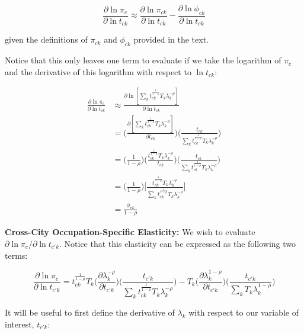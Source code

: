 \documentclass[10pt]{article}
\begin{document}
\begin{equation*}
    \frac{\partial\ln{\pi_{c}}}{\partial\ln{t_{ck}}} \approx \frac{\partial\ln{\pi_{ck}}}{\partial\ln{t_{ck}}} - \frac{\partial\ln{\phi_{ck}}}{\partial\ln{t_{ck}}}
\end{equation*}

given the definitions of $\pi_{ck}$ and $\phi_{ck}$ provided in the text.

Notice that this only leaves one term to evaluate if we take the logarithm of $\pi_{c}$ and the derivative of this logarithm with respect to $\ln{t_{ck}}$:

\begin{align*}
    \frac{\partial\ln{\pi_{c}}}{\partial\ln{t_{ck}}} & \approx \frac{\partial\ln[{\sum\limits_{k}{t^{\frac{1}{1-\rho}}_{ck}}{T_{k}}\lambda_{k}^{-\rho}}]}{\partial\ln{t_{ck}}} \\ &= \Bigg(\frac{\partial[{\sum\limits_{k}{t^{\frac{1}{1-\rho}}_{ck}}{T_{k}}\lambda_{k}^{-\rho}}]}{\partial{t_{ck}}}\Bigg)\Bigg(\frac{t_{ck}}{{\sum\limits_{k}{t^{\frac{1}{1-\rho}}_{ck}}{T_{k}}\lambda_{k}^{-\rho}}}\Bigg)\\ &= \Bigg(\frac{1}{1-\rho}\Bigg)\Bigg(\frac{t_{ck}^{\frac{1}{1-\rho}}{T_{k}}\lambda_{k}^{-\rho}}{t_{ck}}\Bigg)\Bigg(\frac{t_{ck}}{{\sum\limits_{k}{t^{\frac{1}{1-\rho}}_{ck}}{T_{k}}\lambda_{k}^{-\rho}}}\Bigg) \\ &= \Big(\frac{1}{1-\rho}\Big)\Bigg[\frac{{t^{\frac{1}{1-\rho}}_{ck}}{T_{k}}\lambda_{k}^{-\rho}}{\sum\limits_{k}{t^{\frac{1}{1-\rho}}_{ck}}{T_{k}}\lambda_{k}^{-\rho}}\Bigg]\\ &= \frac{\phi_{ck}}{1-\rho}
\end{align*}

\noindent\textbf{Cross-City Occupation-Specific Elasticity:} We wish to evaluate $\partial\ln{\pi_{c}}/\partial\ln{t_{{c'}k}}$. Notice that this elasticity can be expressed as the following two terms:

\begin{equation*}
    \frac{\partial\ln{\pi_{c}}}{\partial\ln{t_{{c'}k}}} = {t^{\frac{1}{1-\rho}}_{ck}}{T_{k}}\Big(\frac{\partial\lambda_{k}^{-\rho}}{\partial{t_{{c'}k}}}\Big)\Big(\frac{t_{{c'}k}}{{\sum\limits_{k}{t^{\frac{1}{1-\rho}}_{ck}}{T_{k}}\lambda_{k}^{-\rho}}}\Big) - {T_{k}}\Big(\frac{\partial\lambda_{k}^{1-\rho}}{\partial{t_{{c'}k}}}\Big)\Big(\frac{t_{{c'}k}}{{\sum\limits_{k}{T_{k}}\lambda_{k}^{1-\rho}}}\Big)
\end{equation*}

It will be useful to first define the derivative of $\lambda_{k}$ with respect to our variable of interest, $t_{{c'}k}$:
\end{document}
